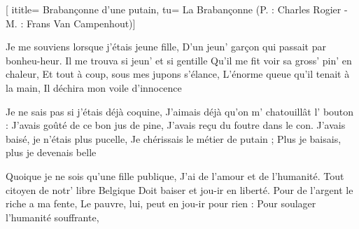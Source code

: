  [
ititle= {Brabançonne d'une putain},
tu= {La Brabançonne (P. : Charles Rogier - M. : Frans Van Campenhout)}]

\beginverse
Je me souviens lorsque j'étais jeune fille,
D'un jeun' garçon qui passait par bonheu-heur.
Il me trouva si jeun' et si gentille
Qu'il me fit voir sa gross' pin' en chaleur,
Et tout à coup, sous mes jupons s'élance,
L'énorme queue qu'il tenait à la main,
Il déchira mon voile d'innocence
\endverse

\beginverse
Je ne sais pas si j'étais déjà coquine,
J'aimais déjà qu'on m' chatouillât l' bouton :
J'avais goûté de ce bon jus de pine,
J'avais reçu du foutre dans le con.
J'avais baisé, je n'étais plus pucelle,
Je chérissais le métier de putain ;
Plus je baisais, plus je devenais belle
\endverse

\beginverse
Quoique je ne sois qu'une fille publique,
J'ai de l'amour et de l'humanité.
Tout citoyen de notr' libre Belgique
Doit baiser et jou-ir en liberté.
Pour de l'argent le riche a ma fente,
Le pauvre, lui, peut en jou-ir pour rien :
Pour soulager l'humanité souffrante,
\endverse

\endsong